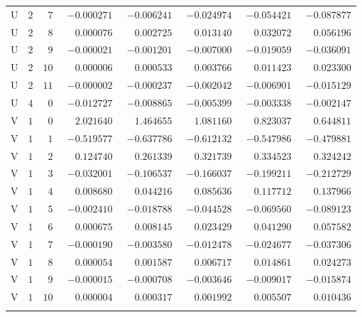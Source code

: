 \begin{table}[H]
\begin{tabular}{crrrrrrr}
U & $2$ & $7$ & $-0.000271$ & $-0.006241$ & $-0.024974$ & $-0.054421$ & $-0.087877$\\
U & $2$ & $8$ & $\phantom{-}0.000076$ & $\phantom{-}0.002725$ & $\phantom{-}0.013140$ & $\phantom{-}0.032072$ & $\phantom{-}0.056196$\\
U & $2$ & $9$ & $-0.000021$ & $-0.001201$ & $-0.007000$ & $-0.019059$ & $-0.036091$\\
U & $2$ & $10$ & $\phantom{-}0.000006$ & $\phantom{-}0.000533$ & $\phantom{-}0.003766$ & $\phantom{-}0.011423$ & $\phantom{-}0.023300$\\
U & $2$ & $11$ & $-0.000002$ & $-0.000237$ & $-0.002042$ & $-0.006901$ & $-0.015129$\\
\addlinespace[2pt]
U & $4$ & $0$ & $-0.012727$ & $-0.008865$ & $-0.005399$ & $-0.003338$ & $-0.002147$\\
\addlinespace[2pt]
V & $1$ & $0$ & $\phantom{-}2.021640$ & $\phantom{-}1.464655$ & $\phantom{-}1.081160$ & $\phantom{-}0.823037$ & $\phantom{-}0.644811$\\
V & $1$ & $1$ & $-0.519577$ & $-0.637786$ & $-0.612132$ & $-0.547986$ & $-0.479881$\\
V & $1$ & $2$ & $\phantom{-}0.124740$ & $\phantom{-}0.261339$ & $\phantom{-}0.321739$ & $\phantom{-}0.334523$ & $\phantom{-}0.324242$\\
V & $1$ & $3$ & $-0.032001$ & $-0.106537$ & $-0.166037$ & $-0.199211$ & $-0.212729$\\
V & $1$ & $4$ & $\phantom{-}0.008680$ & $\phantom{-}0.044216$ & $\phantom{-}0.085636$ & $\phantom{-}0.117712$ & $\phantom{-}0.137966$\\
V & $1$ & $5$ & $-0.002410$ & $-0.018788$ & $-0.044528$ & $-0.069560$ & $-0.089123$\\
V & $1$ & $6$ & $\phantom{-}0.000675$ & $\phantom{-}0.008145$ & $\phantom{-}0.023429$ & $\phantom{-}0.041290$ & $\phantom{-}0.057582$\\
V & $1$ & $7$ & $-0.000190$ & $-0.003580$ & $-0.012478$ & $-0.024677$ & $-0.037306$\\
V & $1$ & $8$ & $\phantom{-}0.000054$ & $\phantom{-}0.001587$ & $\phantom{-}0.006717$ & $\phantom{-}0.014861$ & $\phantom{-}0.024273$\\
V & $1$ & $9$ & $-0.000015$ & $-0.000708$ & $-0.003646$ & $-0.009017$ & $-0.015874$\\
V & $1$ & $10$ & $\phantom{-}0.000004$ & $\phantom{-}0.000317$ & $\phantom{-}0.001992$ & $\phantom{-}0.005507$ & $\phantom{-}0.010436$\\
\addlinespace[2pt]

\end{tabular}
\end{table}

